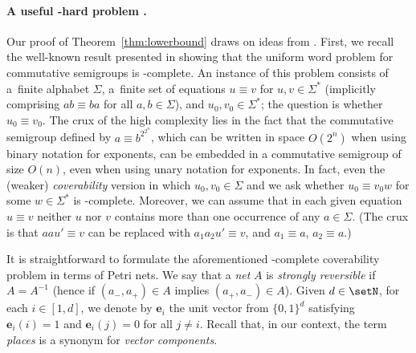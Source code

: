 \paragraph{A useful \EXPSPACE-hard problem \Cover.}
Our proof of Theorem~\ref{thm:lowerbound} draws on ideas from
\cite{DBLP:journals/acta/JancarP19}. First, we recall the
well-known result presented in \cite{mayr1982complexity}
showing that the uniform word problem for commutative
semigroups 
is \EXPSPACE-complete. An instance of this
problem consists of a~finite alphabet $\Sigma$, a~finite set
of equations $u\equiv v$ for $u,v\in\Sigma^*$ (implicitly
comprising $ab\equiv ba$ for all $a,b\in\Sigma$), and
$u_0,v_0\in\Sigma^*$; the question is whether $u_0\equiv v_0$.
The crux of the high complexity lies in the fact that the
commutative semigroup defined by $a\equiv b^{2^{2^n}}$,
which can be written in space $O(2^n)$ when using binary
notation for exponents, can be embedded in a commutative
semigroup of size $O(n)$, even when using unary notation for
exponents. In fact, even the (weaker) \emph{coverability}
version in which $u_0,v_0\in\Sigma$ and we ask whether
$u_0\equiv v_0w$ for some $w\in\Sigma^*$ is
\EXPSPACE-complete. 
Moreover, we can assume that 
in each given equation $u\equiv v$ neither $u$ nor $v$
contains more than one occurrence of any $a \in \Sigma$.
(The crux is that $aau'\equiv v$ can be replaced with  
$a_1a_2u' \equiv v$, and $a_1 \equiv
a$, $a_2 \equiv a$.)

It is straightforward to formulate the aforementioned \EXPSPACE-complete
coverability problem in terms of Petri nets.
We say that a \emph{net} $A$ is
\emph{strongly reversible} if $A=A^{-1}$
(hence if $(a_-,a_+) \in A$ implies $(a_+,a_-) \in A$).
Given $d\in\setN$, for each $i\in[1,d]$, we denote by $\mathbf{e}_i$ the
unit vector from $\{0,1\}^d$ satisfying 
$\mathbf{e}_i(i)=1$ and $\mathbf{e}_{i}(j)=0$ for all
$j\neq i$.
Recall that, in our context, the term \emph{places} is a synonym for \emph{vector components}.

